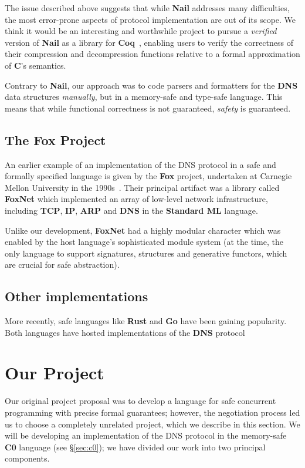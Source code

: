 \documentclass{article}
\newcommand\Kwd[1]{{\sffamily\bfseries{#1}}}
\begin{document}
The issue described above suggests that while \Kwd{Nail} addresses
many difficulties, the most error-prone aspects of protocol
implementation are out of its scope. We think it would be an
interesting and worthwhile project to pursue a \emph{verified} version
of \Kwd{Nail} as a library for \Kwd{Coq}~\citep{coq:reference-manual},
enabling users to verify the correctness of their compression and
decompression functions relative to a formal approximation of
\Kwd{C}'s semantics.

Contrary to \Kwd{Nail}, our approach was to code parsers and
formatters for the \Kwd{DNS} data structures \emph{manually}, but in a
memory-safe and type-safe language. This means that while functional
correctness is not guaranteed, \emph{safety} is guaranteed.


\subsection*{The \Kwd{Fox} Project}
An earlier example of an implementation of the DNS protocol in a safe
and formally specified language is given by the \Kwd{Fox} project,
undertaken at Carnegie Mellon University in the
1990s~\citep{biagioni-harper-lee-milnes:1994,
  biagioni-harper-lee:2001}. Their principal artifact was a library
called \Kwd{FoxNet} which implemented an array of low-level network
infrastructure, including \Kwd{TCP}, \Kwd{IP}, \Kwd{ARP} and \Kwd{DNS}
in the \Kwd{Standard ML} language.

Unlike our development, \Kwd{FoxNet} had a highly modular character
which was enabled by the host language's sophisticated module system
(at the time, the only language to support signatures, structures and
generative functors, which are crucial for safe abstraction).


\subsection*{Other implementations}

More recently, safe languages
like \Kwd{Rust} and \Kwd{Go} have been gaining popularity. Both
languages have hosted implementations of the \Kwd{DNS}
protocol~\citep{github:trust-dns,github:miekg-dns}


\section{Our Project}\label{sec:our-project}

Our original project proposal was to develop a language for safe
concurrent programming with precise formal guarantees; however, the
negotiation process led us to choose a completely unrelated project,
which we describe in this section. We will be developing an
implementation of the DNS protocol in the memory-safe \Kwd{C0}
language (see \S\ref{sec:c0}); we have divided our work into two
principal components.
\end{document}
